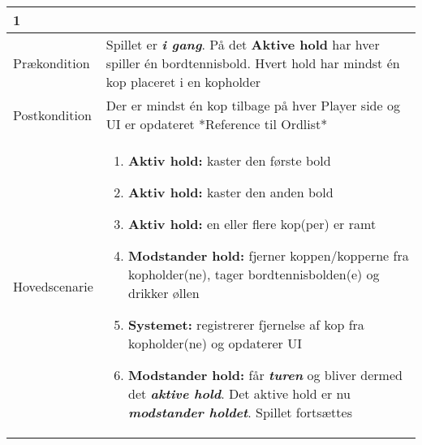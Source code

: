 \documentclass[Kravspecifikation/Kravspec_Main.tex]{subfiles}
\begin{document}
\begin{longtable}[]{@{}ll@{}}
\begin{minipage}[t]{0.47\columnwidth}
{1}\strut
\end{minipage}\tabularnewline
\toprule
\begin{minipage}[t]{0.47\columnwidth}\raggedright
{Prækondition}\strut
\end{minipage} & \begin{minipage}[t]{0.47\columnwidth}\raggedright
{Spillet er \textbf{\textit{i gang}}. På det \textbf{Aktive hold} har hver spiller én bordtennisbold. Hvert hold har mindst én kop placeret i en kopholder}\strut
\end{minipage}\tabularnewline
\toprule
\begin{minipage}[t]{0.47\columnwidth}\raggedright
{Postkondition}\strut
\end{minipage} & \begin{minipage}[t]{0.47\columnwidth}\raggedright
{Der er mindst én kop tilbage på hver Player side og UI er opdateret *Reference til Ordlist*}\strut
\end{minipage}\tabularnewline
\toprule
\begin{minipage}[t]{0.47\columnwidth}\raggedright
{Hovedscenarie}\strut
\end{minipage} & \begin{minipage}[t]{0.47\columnwidth}\raggedright
\begin{enumerate}
\tightlist
\item
  {\textbf{Aktiv hold:} kaster den første bold}
\item
  {\textbf{Aktiv hold:} kaster den anden bold}
\item
  {\textbf{Aktiv hold:} en eller flere kop(per) er ramt}\newline
\item
    {\textbf{Modstander hold:} fjerner koppen/kopperne fra kopholder(ne), tager bordtennisbolden(e) og drikker øllen}
\item 
    {\textbf{Systemet:} registrerer fjernelse af kop fra kopholder(ne) og opdaterer UI}
\item  
    {\textbf{Modstander hold:} får \textbf{\textit{turen}} og bliver dermed det \textbf{\textit{aktive hold}}. Det aktive hold er nu \textbf{\textit{modstander holdet}}. Spillet fortsættes}
\end{enumerate}\strut



\end{minipage}
\end{longtable}
\end{document}
